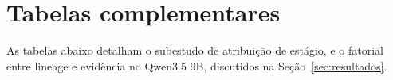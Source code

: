 \section{Tabelas complementares}\label{sec:apendice-tabelas}

As tabelas abaixo detalham o subestudo de atribuição de estágio, e o fatorial entre lineage e evidência no Qwen3.5 9B, discutidos na Seção~\ref{sec:resultados}.



